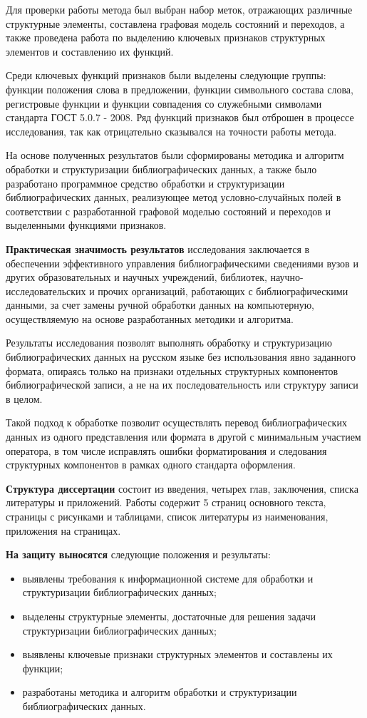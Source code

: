Для проверки работы метода был выбран набор меток, отражающих различные структурные элементы, составлена графовая модель состояний и переходов, а также проведена работа по выделению ключевых признаков структурных элементов и составлению их функций.

Среди ключевых функций признаков были выделены следующие группы: функции положения слова в предложении, функции символьного состава слова, регистровые функции и функции совпадения со служебными символами стандарта ГОСТ 5.0.7 - 2008. Ряд функций признаков был отброшен в процессе исследования, так как отрицательно сказывался на точности работы метода.

На основе полученных результатов были сформированы методика и алгоритм обработки и структуризации библиографических данных, а также было разработано программное средство обработки и структуризации библиографических данных, реализующее метод условно-случайных полей в соответствии с разработанной графовой моделью состояний и переходов и выделенными функциями признаков.

\textbf{Практическая значимость результатов} исследования заключается в обеспечении эффективного управления библиографическими сведениями вузов и других образовательных и научных учреждений, библиотек, научно-исследовательских и прочих организаций, работающих с библиографическими данными, за счет замены ручной обработки данных на компьютерную, осуществляемую на основе разработанных методики и алгоритма.

Результаты исследования позволят выполнять обработку и структуризацию библиографических данных на русском языке без использования явно заданного формата, опираясь только на признаки отдельных структурных компонентов библиографической записи, а не на их последовательность или структуру записи в целом.

Такой подход к обработке позволит осуществлять перевод библиографических данных из одного представления или формата в другой с минимальным участием оператора, в том числе исправлять ошибки форматирования и следования структурных компонентов в рамках одного стандарта оформления.

\textbf{Структура диссертации} состоит из введения, четырех глав, заключения, списка литературы и приложений. Работы содержит 5 страниц основного текста, страницы с рисунками и таблицами, список литературы из наименования, приложения на страницах.

\textbf{На защиту выносятся} следующие положения и результаты:
\begin{itemize}
	\item выявлены требования к информационной системе для обработки и структуризации библиографических данных;
	\item выделены структурные элементы, достаточные для решения задачи структуризации библиографических данных;
	\item выявлены ключевые признаки структурных элементов и составлены их функции;
	\item разработаны методика и алгоритм обработки и структуризации библиографических данных.
\end{itemize}
